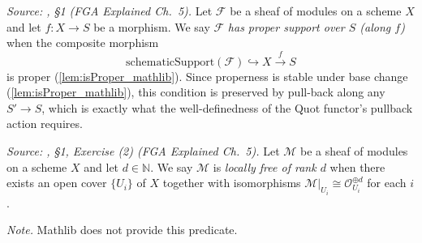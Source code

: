 \begin{definition}\leanok
  \label{def:has_proper_support}
  \textit{Source: \cite{nitsure-hilbert-quot}, \S 1 (FGA Explained Ch.~5).}
  Let \(\mathcal{F}\) be a sheaf of modules on a scheme \(X\) and let
  \(f : X \to S\) be a morphism. We say \(\mathcal{F}\) \emph{has proper support
  over \(S\) (along \(f\))} when the composite morphism
  \[
    \mathrm{schematicSupport}(\mathcal{F}) \hookrightarrow X \xrightarrow{f} S
  \]
  is proper (\cref{lem:isProper_mathlib}). Since properness is stable under base
  change (\cref{lem:isProper_mathlib}), this condition is preserved by pull-back
  along any \(S'\to S\), which is exactly what the well-definedness of the Quot
  functor's pullback action requires.
\end{definition}

\begin{definition}\leanok
  \label{def:is_locally_free_of_rank}
  \textit{Source: \cite{nitsure-hilbert-quot}, \S 1, Exercise (2) (FGA Explained Ch.~5).}
  Let \(\mathcal{M}\) be a sheaf of modules on a scheme \(X\) and let
  \(d \in \mathbb{N}\). We say \(\mathcal{M}\) is \emph{locally free of rank
  \(d\)} when there exists an open cover \(\{U_i\}\) of \(X\) together with
  isomorphisms \(\mathcal{M}|_{U_i} \cong \mathcal{O}_{U_i}^{\oplus d}\) for
  each \(i\).

  \emph{Note.} Mathlib does not provide this predicate.
\end{definition}


